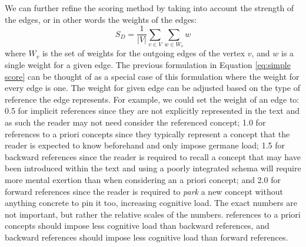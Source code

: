 \documentclass[12pt]{article}
\begin{document}

We can further refine the scoring method by taking into account the strength of the edges, or in other words the weights of the edges:
\begin{equation} \label{eq:weighed score}
    S_D = \frac{1}{|V|} \sum_{v \in V} \sum_{w \in W_v} w
\end{equation}
where $W_v$ is the set of weights for the outgoing edges of the vertex $v$, and $w$ is a single weight for a given edge. The previous formulation in Equation \ref{eq:simple score} can be thought of as a special case of this formulation where the weight for every edge is one.
The weight for given edge can be adjusted based on the type of reference the edge represents. For example, we could set the weight of an edge to: 0.5 for implicit references since they are not explicitly represented in the text and as such the reader may not need consider the referenced concept; 1.0 for references to a priori concepts since they typically represent a concept that the reader is expected to know beforehand and only impose germane load; 1.5 for backward references since the reader is required to recall a concept that may have been introduced within the text and using a poorly integrated schema will require more mental exertion than when considering an a priori concept; and 2.0 for forward references since the reader is required to \textit{park} a new concept without anything concrete to pin it too, increasing cognitive load. The exact numbers are not important, but rather the relative scales of the numbers. references to a priori concepts should impose less cognitive load than backward references, and backward references should impose less cognitive load than forward references.
\end{document}
